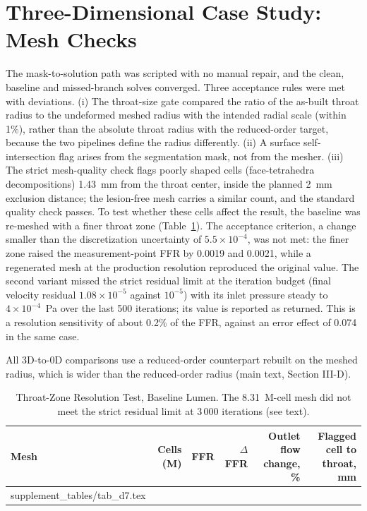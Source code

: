 \documentclass[journal,onecolumn,11pt]{IEEEtran}
\begin{document}
\FloatBarrier
\section{Three-Dimensional Case Study: Mesh Checks}\label{sec:cfd}
The mask-to-solution path was scripted with no manual repair, and the clean, baseline and missed-branch solves
converged. Three acceptance rules were met with deviations. (i) The throat-size gate compared the ratio of the
as-built throat radius to the undeformed meshed radius with the intended radial scale (within 1\%), rather than the
absolute throat radius with the reduced-order target, because the two pipelines define the radius differently. (ii) A surface self-intersection flag arises from the segmentation mask, not from the mesher. (iii) The
strict mesh-quality check flags poorly shaped cells (face-tetrahedra decompositions) 1.43~mm from the throat center,
inside the planned 2~mm exclusion distance; the lesion-free mesh carries a similar count, and the standard quality
check passes. To test whether these cells affect the result, the baseline was re-meshed with a finer throat zone
(Table~\ref{tab:d7}). The acceptance criterion, a change smaller than the discretization uncertainty of
$5.5\times10^{-4}$, was not met: the finer zone raised the measurement-point FFR by 0.0019 and 0.0021, while a
regenerated mesh at the production resolution reproduced the original value. The second variant missed the strict
residual limit at the iteration budget (final velocity residual $1.08\times10^{-5}$ against $10^{-5}$) with its inlet
pressure steady to $4\times10^{-4}$~Pa over the last 500 iterations; its value is reported as returned. This is a resolution sensitivity of
about 0.2\% of the FFR, against an error effect of 0.074 in the same case.

All 3D-to-0D comparisons use a reduced-order counterpart rebuilt on the meshed radius, which is wider than the
reduced-order radius (main text, Section III-D).
\begin{table}[!ht]
\caption{Throat-Zone Resolution Test, Baseline Lumen. The 8.31~M-cell mesh did not meet the strict residual limit at
3\,000 iterations (see text).}\label{tab:d7}
\centering\small
\begin{tabular}{@{}lrrrrr@{}}
\toprule
Mesh & Cells (M) & FFR & $\Delta$FFR & Outlet flow change, \% & Flagged cell to throat, mm\\
\midrule
{} supplement_tables/tab_d7.tex 
\bottomrule
\end{tabular}
\end{table}
\end{document}
